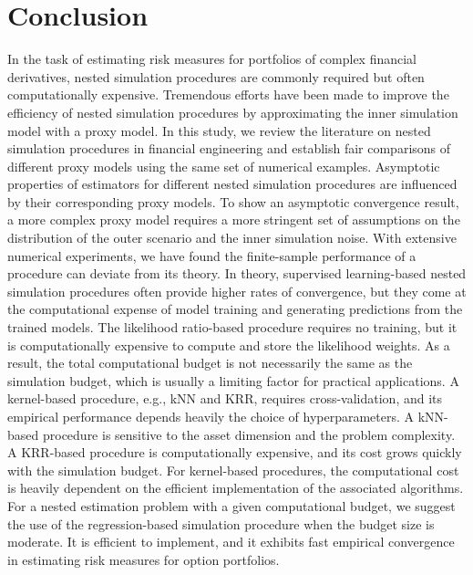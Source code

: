 \section{Conclusion} \label{sec1:conclusion}
In the task of estimating risk measures for portfolios of complex financial derivatives, nested simulation procedures are commonly required but often computationally expensive. 
Tremendous efforts have been made to improve the efficiency of nested simulation procedures by approximating the inner simulation model with a proxy model. 
In this study, we review the literature on nested simulation procedures in financial engineering and establish fair comparisons of different proxy models using the same set of numerical examples. 
Asymptotic properties of estimators for different nested simulation procedures are influenced by their corresponding proxy models.
To show an asymptotic convergence result, a more complex proxy model requires a more stringent set of assumptions on the distribution of the outer scenario and the inner simulation noise.
With extensive numerical experiments, we have found the finite-sample performance of a procedure can deviate from its theory. 
In theory, supervised learning-based nested simulation procedures often provide higher rates of convergence, but they come at the computational expense of model training and generating predictions from the trained models. 
The likelihood ratio-based procedure requires no training, but it is computationally expensive to compute and store the likelihood weights.
As a result, the total computational budget is not necessarily the same as the simulation budget, which is usually a limiting factor for practical applications.
A kernel-based procedure, e.g., kNN and KRR, requires cross-validation, and its empirical performance depends heavily the choice of hyperparameters.
A kNN-based procedure is sensitive to the asset dimension and the problem complexity.
A KRR-based procedure is computationally expensive, and its cost grows quickly with the simulation budget.
For kernel-based procedures, the computational cost is heavily dependent on the efficient implementation of the associated algorithms.
For a nested estimation problem with a given computational budget, we suggest the use of the regression-based simulation procedure when the budget size is moderate. 
It is efficient to implement, and it exhibits fast empirical convergence in estimating risk measures for option portfolios. 

